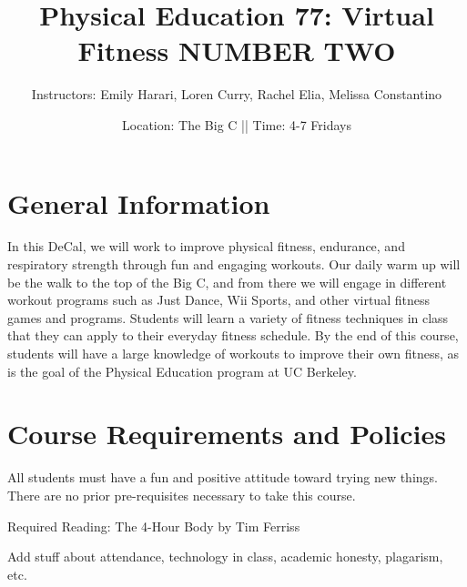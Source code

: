 \documentclass[letterpaper,12pt]{article}
\begin{document}
\title{Physical Education 77: Virtual Fitness NUMBER TWO}
\date{Location: The Big C || Time: 4-7 Fridays }
\author{Instructors: Emily Harari, Loren Curry, Rachel Elia, Melissa Constantino}
\maketitle

\section{General Information}
In this DeCal, we will work to improve physical fitness, endurance, and respiratory strength through fun and engaging workouts. Our daily warm up will be the walk to the top of the Big C, and from there we will engage in different workout programs such as Just Dance, Wii Sports, and other virtual fitness games and programs. Students will learn a variety of fitness techniques in class that they can apply to their everyday fitness schedule. By the end of this course, students will have a large knowledge of workouts to improve their own fitness, as is the goal of the Physical Education program at UC Berkeley.



\section{Course Requirements and Policies}

All students must have a fun and positive attitude toward trying new things. There are no prior pre-requisites necessary to take this course.

Required Reading: The 4-Hour Body by Tim Ferriss


Add stuff about attendance, technology in class, academic honesty, plagarism, etc.
\end{document}
